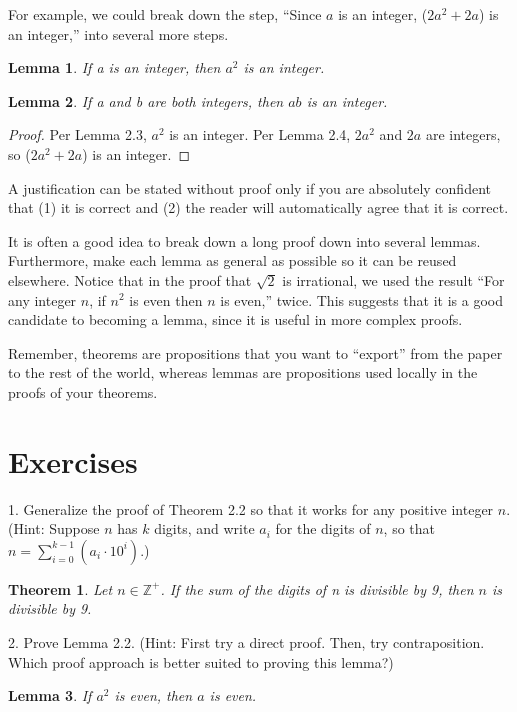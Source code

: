 \documentclass[12pt,a4paper]{article}
\newtheorem{theorem}{Theorem}[section]
\newtheorem{lemma}{Lemma}[section]
\theoremstyle{definition}
\begin{document}
For example, we could break down the step, ``Since $a$ is an integer, ($2a^2+2a$) is an integer,'' into several more steps.

\begin{lemma}
If a is an integer, then $a^2$ is an integer.
\end{lemma}

\begin{lemma}
If a and b are both integers, then $ab$ is an integer.
\end{lemma}

\begin{proof}
Per Lemma 2.3, $a^2$ is an integer. Per Lemma 2.4, $2a^2$ and $2a$ are integers, so ($2a^2+2a$) is an integer.
\end{proof}

A justification can be stated without proof only if you are absolutely confident that (1) it is correct and (2) the reader will automatically agree that it is correct.

\bigbreak

It is often a good idea to break down a long proof down into several lemmas. Furthermore, make each lemma as general as possible so it can be reused elsewhere. Notice that in the proof that $\sqrt{2}$ is irrational, we used the result ``For any integer $n$, if $n^2$ is even then $n$ is even,'' twice. This suggests that it is a good candidate to becoming a lemma, since it is useful in more complex proofs.

\bigbreak

Remember, theorems are propositions that you want to ``export'' from the paper to the rest of the world, whereas lemmas are propositions used locally in the proofs of your theorems.

\section*{Exercises}

1. Generalize the proof of Theorem 2.2 so that it works for any positive integer $n$. (Hint: Suppose $n$ has $k$ digits, and write $a_i$ for the digits of $n$, so that $n=\sum_{i=0}^{k-1}(a_i\cdot 10^i)$.)

\begin{theorem}
Let $n\in\mathbb{Z}^+$. If the sum of the digits of n is divisible by 9, then $n$ is divisible by 9.
\end{theorem}

2. Prove Lemma 2.2. (Hint: First try a direct proof. Then, try contraposition. Which proof approach is better suited to proving this lemma?)

\setcounter{lemma}{1}

\begin{lemma}
If $a^2$ is even, then $a$ is even.
\end{lemma}
\end{document}
